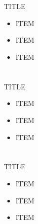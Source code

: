\documentclass[14pt,dvipdfmx]{beamer}
\title{%
\texorpdfstring{%
\large
TITLE
\vskip10pt%
{\color{gray}\hrule height 1pt}%
\vskip-20pt%
}
{title}
}
\author{%
\texorpdfstring{%
\small
NAME
\\[-\baselineskip]  
{%
\setlength{\leftmargini}{12pt}
\setlength{\leftmarginii}{16pt}
\begin{itemize}
 \footnotesize
 \color{black}
 \setlength\itemsep{0pt}
 \setlength\parskip{0pt}
 \item Motivation
 \begin{itemize}
  \footnotesize
  \color{black}
  \item ...
 \end{itemize}
 \item Model and method
 \begin{itemize}
  \footnotesize
  \color{black}
  \item ...
  \item ...
 \end{itemize}
 \item Results
 \begin{itemize}
  \footnotesize
  \color{black}
  \item ...
 \end{itemize}
 \item Conclusions
 \begin{itemize}
  \footnotesize
  \color{black}
  \item ...
 \end{itemize}
\end{itemize}
}
}
{NAME}
}
\date{}
\begin{document}

\begin{frame}[noframenumbering]
\maketitle
\end{frame}


\section[]{}
\begin{frame}[containsverbatim,c]{%
TITLE}
\begin{center}
\footnotesize
{\setlength{\leftmargini}{12pt}
\setlength{\leftmarginii}{16pt}
\begin{itemize}
 \item
ITEM
 \item
ITEM
 \item
ITEM
\end{itemize}}
\end{center}
\end{frame}

\section[]{}
\begin{frame}[containsverbatim,c]{%
TITLE}
\begin{center}
\footnotesize
{\setlength{\leftmargini}{12pt}
\setlength{\leftmarginii}{16pt}
\begin{itemize}
 \item
ITEM
 \item
ITEM
 \item
ITEM
\end{itemize}}
\end{center}
\end{frame}

\section[]{}
\begin{frame}[containsverbatim,c]{%
TITLE}
\begin{center}
\footnotesize
{\setlength{\leftmargini}{12pt}
\setlength{\leftmarginii}{16pt}
\begin{itemize}
 \item
ITEM
 \item
ITEM
 \item
ITEM
\end{itemize}}
\end{center}
\end{frame}
\end{document}
